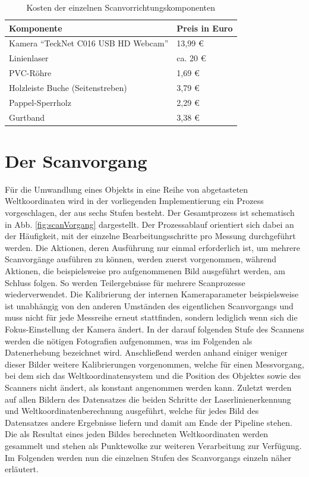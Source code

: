 \begin{table} %
	\centering
		\begin{tabular}{l | l}
		\textbf{Komponente} & \textbf{Preis in Euro}\\
		\hline
			Kamera "`TeckNet C016 USB HD Webcam"' & 13,99 \euro\\
			Linienlaser &  ca. 20 \euro\\
			PVC-Röhre & 1,69 \euro\\
			Holzleiste Buche (Seitenstreben) & 3,79 \euro\\
			Pappel-Sperrholz &  2,29 \euro\\
			Gurtband & 3,38 \euro
		\end{tabular}
	\caption{Kosten der einzelnen Scanvorrichtungskomponenten}
	\label{tab:preise}
\end{table}


\section{Der Scanvorgang}
\label{sec:scanvorgang}
Für die Umwandlung eines Objekts in eine Reihe von abgetasteten Weltkoordinaten wird in der vorliegenden Implementierung ein Prozess vorgeschlagen, der aus sechs Stufen besteht. Der Gesamtprozess ist schematisch in Abb. \ref{fig:scanVorgang} dargestellt. Der Prozessablauf orientiert sich dabei an der Häufigkeit, mit der einzelne Bearbeitungsschritte pro Messung durchgeführt werden. Die Aktionen, deren Ausführung nur einmal erforderlich ist, um mehrere Scanvorgänge ausführen zu können, werden zuerst vorgenommen, während Aktionen, die beispielsweise pro aufgenommenen Bild ausgeführt werden, am Schluss folgen. So werden Teilergebnisse für mehrere Scanprozesse wiederverwendet. \newline
Die Kalibrierung der internen Kameraparameter beispielsweise ist unabhängig von den anderen Umständen des eigentlichen Scanvorgangs und muss nicht für jede Messreihe erneut stattfinden, sondern lediglich wenn sich die Fokus-Einstellung der Kamera ändert. In der darauf folgenden Stufe des Scannens werden die nötigen Fotografien aufgenommen, was im Folgenden als Datenerhebung bezeichnet wird. Anschließend werden anhand einiger weniger dieser Bilder weitere Kalibrierungen vorgenommen, welche für einen Messvorgang, bei dem sich das Weltkoordinatensystem und die Position des Objektes sowie des Scanners nicht ändert, als konstant angenommen werden kann. Zuletzt werden auf allen Bildern des Datensatzes die beiden Schritte der Laserlinienerkennung und Weltkoordinatenberechnung ausgeführt, welche für jedes Bild des Datensatzes andere Ergebnisse liefern und damit am Ende der Pipeline stehen. Die als Resultat eines jeden Bildes berechneten Weltkoordinaten werden gesammelt und stehen als Punktewolke zur weiteren Verarbeitung zur Verfügung. Im Folgenden werden nun die einzelnen Stufen des Scanvorgangs einzeln näher erläutert.


